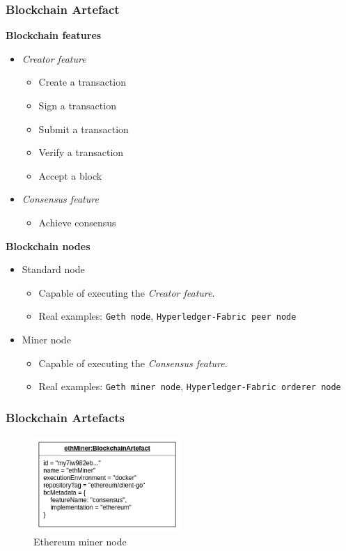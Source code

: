 \documentclass{beamer}
\begin{document}
	\begin{frame}
		\frametitle{Blockchain Artefact}
		\textbf{Blockchain features}
		\begin{itemize}
			\item \textit{Creator feature}
			\begin{itemize}
				\item Create a transaction
				\item Sign a transaction
				\item Submit a transaction
				\item Verify a transaction
				\item Accept a block
			\end{itemize}
			\item \textit{Consensus feature}
			\begin{itemize}
				\item Achieve consensus
			\end{itemize}
		\end{itemize}
		\textbf{Blockchain nodes}
		\begin{itemize}
			\item Standard node
			\begin{itemize}
				\item Capable of executing the \textit{Creator feature}.
				\item Real examples: \texttt{Geth node}, \texttt{Hyperledger-Fabric peer node}
			\end{itemize}
			\item Miner node
			\begin{itemize}
				\item Capable of executing the \textit{Consensus feature}.
				\item Real examples: \texttt{Geth miner node}, \texttt{Hyperledger-Fabric orderer node}
			\end{itemize}
		\end{itemize}
	\end{frame}

	\begin{frame}
		\frametitle{Blockchain Artefacts}
		\begin{figure}
			\centering
			\includegraphics[width=0.5\textwidth]{figures/bc_artefact_example.png}
			\vspace{-0.5cm}
			\caption{Ethereum miner node}
			\label{fig:bc_artefact_example}
		\end{figure}
	\end{frame}
\end{document}
